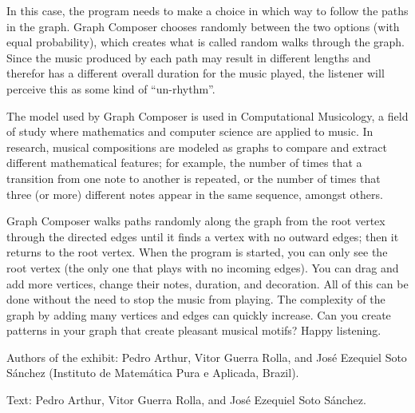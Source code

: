 In this case, the program needs to make a choice in which way to follow the paths in the graph. Graph Composer chooses randomly between the two options (with equal probability), which creates what is called random walks through the graph. Since the music produced by each path may result in different lengths and therefor has a different overall duration for the music played, the listener will perceive this as some kind of ``un-rhythm''.

The model used by Graph Composer is used in Computational Musicology, a field of study where mathematics and computer science are applied to music. In research, musical compositions are modeled as graphs to compare and extract different mathematical features; for example, the number of times that a transition from one note to another is repeated, or the number of times that three (or more) different notes appear in the same sequence, amongst others.

Graph Composer walks paths randomly along the graph from the root vertex through the directed edges until it finds a vertex with no outward edges; then it returns to the root vertex. When the program is started, you can only see the root vertex (the only one that plays with no incoming edges). You can drag and add more vertices, change their notes, duration, and decoration. All of this can be done without the need to stop the music from playing. The complexity of the graph by adding many vertices and edges can quickly increase. Can you create patterns in your graph that create pleasant musical motifs? Happy listening.

\begin{sectcredits}
\item[Authors of the exhibit:] Pedro Arthur, Vitor Guerra Rolla, and José Ezequiel Soto Sánchez (Instituto de Matemática Pura e Aplicada, Brazil).

\item[Text:] Pedro Arthur, Vitor Guerra Rolla, and José Ezequiel Soto Sánchez.

\end{sectcredits}

